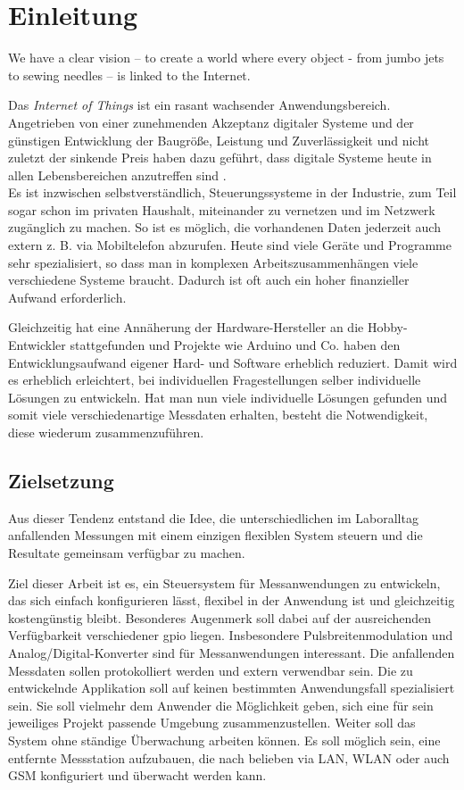 \chapter{Einleitung}

\glqq We have a clear vision – to create a world where every object - from jumbo jets to sewing needles – is linked to the Internet.\grqq \cite[Helen Duce, Seite 1]{iot2020}

Das \textit{Internet of Things} ist ein rasant wachsender Anwendungsbereich. Angetrieben von einer zunehmenden Akzeptanz digitaler Systeme und der günstigen Entwicklung der Baugröße, Leistung und Zuverlässigkeit und nicht zuletzt der sinkende Preis haben dazu geführt, dass digitale Systeme heute in allen Lebensbereichen anzutreffen sind \cite{iot2020, weiser1991}.\\

Es ist inzwischen selbstverständlich, Steuerungssysteme in der Industrie, zum Teil sogar schon im privaten Haushalt, miteinander zu vernetzen und im Netzwerk zugänglich zu machen. So ist es möglich, die vorhandenen Daten jederzeit auch extern z. B. via Mobiltelefon abzurufen. Heute sind viele Geräte und Programme sehr spezialisiert, so dass man in komplexen Arbeitszusammenhängen viele verschiedene Systeme braucht. Dadurch ist oft auch ein hoher finanzieller Aufwand erforderlich.

Gleichzeitig hat eine Annäherung der Hardware-Hersteller an die \glqq Hobby\grqq -Entwickler stattgefunden und Projekte wie Arduino und Co. haben den Entwicklungsaufwand eigener Hard- und Software erheblich reduziert. Damit wird es erheblich erleichtert, bei individuellen Fragestellungen selber individuelle Lösungen zu entwickeln. Hat man nun viele individuelle Lösungen gefunden und somit viele verschiedenartige Messdaten erhalten, besteht die Notwendigkeit, diese wiederum zusammenzuführen.


\section{Zielsetzung}
Aus dieser Tendenz entstand die Idee, die unterschiedlichen im Laboralltag anfallenden Messungen mit einem einzigen flexiblen System steuern und die Resultate gemeinsam verfügbar zu machen. 

Ziel dieser Arbeit ist es, ein Steuersystem für Messanwendungen zu entwickeln, das sich einfach konfigurieren lässt, flexibel in der Anwendung ist und gleichzeitig kostengünstig bleibt. Besonderes Augenmerk soll dabei auf der ausreichenden Verfügbarkeit verschiedener \gls{gpio} liegen. Insbesondere Pulsbreitenmodulation und Analog/Digital-Konverter sind für Messanwendungen interessant. Die anfallenden Messdaten sollen protokolliert werden und extern verwendbar sein. Die zu entwickelnde Applikation soll auf keinen bestimmten Anwendungsfall spezialisiert sein. Sie soll vielmehr dem Anwender die Möglichkeit geben, sich eine für sein jeweiliges Projekt passende Umgebung zusammenzustellen. Weiter soll das System ohne ständige Überwachung arbeiten können. Es soll möglich sein, eine  entfernte Messstation aufzubauen, die nach belieben via LAN, WLAN oder auch GSM konfiguriert und überwacht werden kann.\\

